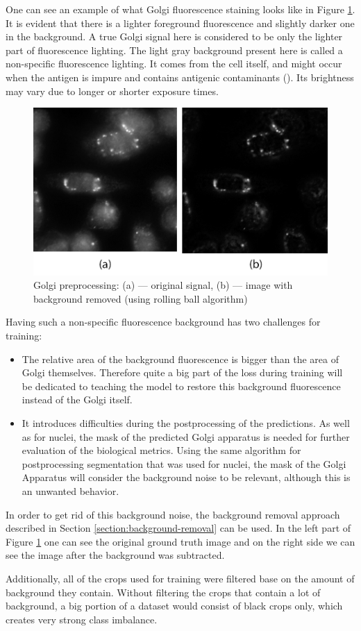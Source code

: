 One can see an example of what Golgi fluorescence staining looks like in Figure \ref{fig:golgi-enhancement}. It is evident that there is a lighter foreground fluorescence and slightly darker one in the background. A true Golgi signal here is considered to be only the lighter part of fluorescence lighting. The light gray background present here is called a non-specific fluorescence lighting. It comes from the cell itself, and might occur when the antigen is impure and contains antigenic contaminants (\cite{Borek_1984}). Its brightness may vary due to longer or shorter exposure times. 

\begin{figure}[htb]
	\begin{center}
		\includegraphics[width=0.5\linewidth]{bilder/enhancement.png}
		\caption[Golgi preprocessing]%
		{Golgi preprocessing: (a) --- original signal, (b) --- image with background removed (using rolling ball algorithm)}\label{fig:golgi-enhancement}
	\end{center}
\end{figure}

Having such a non-specific fluorescence background has two challenges for training:
\begin{itemize}
    \item The relative area of the background fluorescence is bigger than the area of Golgi themselves. Therefore quite a big part of the loss during training will be dedicated to teaching the model to restore this background fluorescence instead of the Golgi itself.
    \item It introduces difficulties during the postprocessing of the predictions. As well as for nuclei, the mask of the predicted Golgi apparatus is needed for further evaluation of the biological metrics. Using the same algorithm for postprocessing segmentation that was used for nuclei, the mask of the Golgi Apparatus will consider the background noise to be relevant, although this is an unwanted behavior.
\end{itemize}

In order to get rid of this background noise, the background removal approach described in Section \ref{section:background-removal} can be used. In the left part of Figure \ref{fig:golgi-enhancement} one can see the original ground truth image and on the right side we can see the image after the background was subtracted.

Additionally, all of the crops used for training were filtered base on the amount of background they contain. Without filtering the crops that contain a lot of background, a big portion of a dataset would consist of black crops only, which creates very strong class imbalance.
